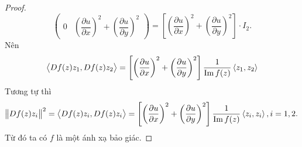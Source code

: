 \begin{proof}
\[\begin{pmatrix}
                 0& \left(\dfrac{\partial u}{\partial x}\right)^2  + \left(\dfrac{\partial u}{\partial y}\right)^2
            \end{pmatrix}
            = \left[\left(\dfrac{\partial u}{\partial x}\right)^2  + \left(\dfrac{\partial u}{\partial y}\right)^2\right]\cdot I_2.
    \]
    Nên \[\left<Df(z)z_1,Df(z)z_2\right> =  \left[\left(\dfrac{\partial u}{\partial x}\right)^2  + \left(\dfrac{\partial u}{\partial y}\right)^2\right]\dfrac{1}{\operatorname{Im} f(z)} \left<z_1,z_2\right> \]
    Tương tự thì 
    \[\norm{Df(z)z_i}^2 = \left<Df(z)z_i,Df(z)z_i\right> =  \left[\left(\dfrac{\partial u}{\partial x}\right)^2  + \left(\dfrac{\partial u}{\partial y}\right)^2\right]\dfrac{1}{\operatorname{Im} f(z)} \left<z_i,z_i\right>, i =1,2. \]
    Từ đó ta có $f$ là một ánh xạ bảo giác.
    
\end{proof}
